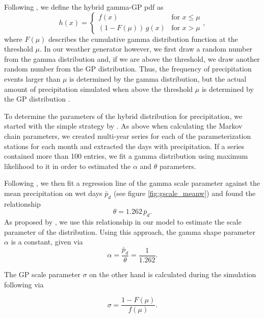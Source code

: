 \documentclass[
11pt, %
english, %
singlespacing, %
headsepline, %
]{MastersDoctoralThesis} %
\begin{document}
\begin{NoHyper}
\begin{refsection}
Following \cite{FurrerKatz2008}, we define the hybrid gamma-GP pdf as
\begin{equation}
h(x) = \begin{cases}
f(x) & \text{for } x \leq \mu \\
(1 - F(\mu))\,g(x) & \text{for }  x > \mu
\end{cases}, \label{eq:GammaGP}
\end{equation}
where $F(\mu)$ describes the cumulative gamma distribution function at the threshold $\mu$. In our weather generator however, we first draw a random number from the gamma distribution and, if we are above the threshold, we draw another random number from the GP distribution. Thus, the frequency of precipitation events larger than $\mu$ is determined by the gamma distribution, but the actual amount of precipitation simulated when above the threshold $\mu$ is determined by the GP distribution \citep{FurrerKatz2008}.

To determine the parameters of the hybrid distribution for precipitation, we started with the simple strategy by \cite{GengDevriesSupit1986}. As above when calculating the Markov chain parameters, we created multi-year series for each of the parameterization stations for each month and extracted the days with precipitation. If a series contained more than 100 entries, we fit a gamma distribution using maximum likelihood to it in order to estimated the $\alpha$ and $\theta$ parameters.

Following \cite{GengDevriesSupit1986}, we then fit a regression line of the gamma scale parameter against the mean precipitation on wet days $\bar{p}_d$ (see figure \ref{fig:gscale_meanw}) and found the relationship
\begin{equation}
\theta = 1.262\, \bar{p}_d. \label{eq:gamma_scale}
\end{equation}
As proposed by \cite{GengDevriesSupit1986}, we use this relationship in our model to estimate the scale parameter of the distribution. Using this approach, the gamma shape parameter $\alpha$ is a constant, given via
\begin{equation}
\alpha = \frac{\bar{p}_d}{\theta} = \frac{1}{1.262}. \label{eq:gamma_shape}
\end{equation}

The GP scale parameter $\sigma$ on the other hand is calculated during the simulation following \cite{NeykovNeytchevZucchini2014} via

\begin{equation}
\sigma = \frac{1 - F(\mu)}{f(\mu)}. \label{eq:gp_scale}
\end{equation}


\end{refsection}
\end{NoHyper}
\end{document}

